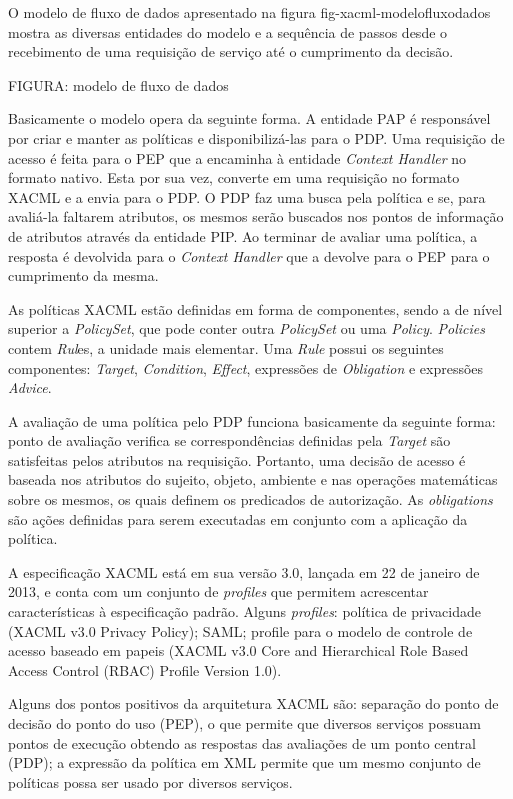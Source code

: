 \documentclass{doublecol-new}
\begin{document}
O modelo de fluxo de dados apresentado na figura fig-xacml-modelofluxodados mostra as diversas entidades do modelo e a sequência de passos desde o recebimento de uma requisição de serviço até o cumprimento da decisão.

FIGURA: modelo de fluxo de dados
	
Basicamente o modelo opera da seguinte forma. A entidade PAP é responsável por criar e manter as políticas e disponibilizá-las para o PDP. Uma requisição de acesso é feita para o PEP que a encaminha à entidade \textit{Context Handler} no formato nativo. Esta por sua vez, converte em uma requisição no formato XACML e a envia para o PDP. O PDP faz uma busca pela política e se, para avaliá-la faltarem atributos, os mesmos serão buscados nos pontos de informação de atributos através da entidade PIP. Ao terminar de avaliar uma política, a resposta é devolvida para o \textit{Context Handler} que a devolve para o PEP para o cumprimento da mesma.
	
As políticas XACML estão definidas em forma de componentes, sendo a de nível superior a \textit{PolicySet}, que pode conter outra \textit{PolicySet} ou uma \textit{Policy}. \textit{Policies} contem \textit{Rul}es, a unidade mais elementar. Uma \textit{Rule} possui os seguintes componentes: \textit{Target}, \textit{Condition}, \textit{Effect}, expressões de \textit{Obligation} e expressões \textit{Advice}.
	
A avaliação de uma política pelo PDP funciona basicamente da seguinte forma: ponto de avaliação verifica se correspondências definidas pela \textit{Target} são satisfeitas pelos atributos na requisição. Portanto, uma decisão de acesso é baseada nos atributos do sujeito, objeto, ambiente e nas operações matemáticas sobre os mesmos, os quais definem os predicados de autorização. As \textit{obligations} são ações definidas para serem executadas em conjunto com a aplicação da política.
	
A especificação XACML está em sua versão 3.0, lançada em 22 de janeiro de 2013, e conta com um conjunto de \textit{profiles} que permitem acrescentar características à especificação padrão. Alguns \textit{profiles}: política de privacidade (XACML v3.0 Privacy Policy); SAML; profile para o modelo de controle de acesso baseado em papeis (XACML v3.0 Core and Hierarchical Role Based Access Control (RBAC) Profile Version 1.0).
	
Alguns dos pontos positivos da arquitetura XACML são: separação do ponto de decisão do ponto do uso (PEP), o que permite que diversos serviços possuam pontos de execução obtendo as respostas das avaliações de um ponto central (PDP); a expressão da política em XML permite que um mesmo conjunto de políticas possa ser usado por diversos serviços.
	
\end{document}
